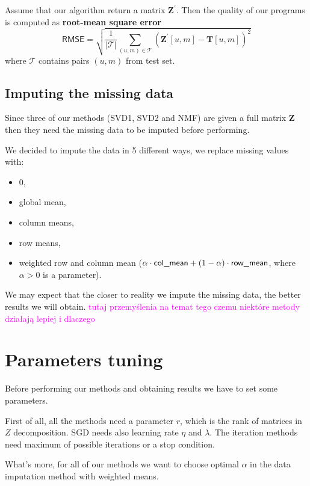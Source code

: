 \documentclass[11pt]{amsart}
\newcommand{\tami}[1]{{\textcolor{magenta}{#1}}}
\begin{document}
Assume that our algorithm return a matrix $\boldsymbol{Z}^{'}$.
Then the quality of our programs is computed as \textbf{root-mean square error}
\[\textsf{RMSE} =
\sqrt{\frac{1}{|\mathcal{T}|} \sum_{(u,m) \in \mathcal{T}} \left(\boldsymbol{Z}^{'}[u,m] - \boldsymbol{T}[u,m] \right)^2}\]
where $\mathcal{T}$ contains pairs $(u,m)$ from test set.


\subsection*{Imputing the missing data}

Since three of our methods (SVD1, SVD2 and NMF) are given a full matrix $\boldsymbol{Z}$ then they need the missing data to be imputed before performing.

We decided to impute the data in 5 different ways, we replace missing values with:
\begin{itemize}
    \item 0,
    \item global mean,
    \item column means,
    \item row means,
    \item weighted row and column mean ($\alpha \cdot \text{\textsf{col\_mean}} + (1-\alpha) \cdot \text{\textsf{row\_mean}}$, where $\alpha>0$ is a parameter).
\end{itemize}

We may expect that the closer to reality we impute the missing data, the better results we will obtain.
\tami{tutaj przemyślenia na temat tego czemu niektóre metody działają lepiej i dlaczego}






\section{Parameters tuning}

Before performing our methods and obtaining results we have to set some parameters.

First of all, all the methods need a parameter $r$, which is the rank of matrices in $Z$ decomposition.
SGD needs also learning rate $\eta$ and $\lambda$.
The iteration methods need maximum of possible iterations or a stop condition.

What's more, for all of our methods we want to choose optimal $\alpha$ in the data imputation method with weighted means.
\end{document}
